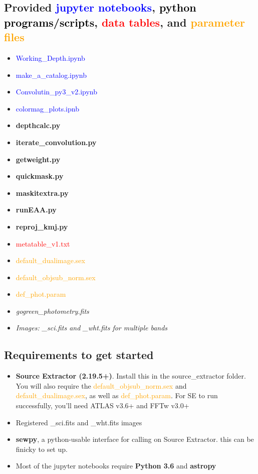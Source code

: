 \documentclass[a4paper,10pt]{article}
\begin{document}
\subsection*{Provided \textcolor{blue}{jupyter notebooks}, \textcolor{black}{\textbf{python programs/scripts}}, \textcolor{red}{data tables}, and \textcolor{orange}{parameter files}}
\begin{itemize}
 \setlength{\itemsep}{-5.5pt}
 \item \textcolor{blue}{Working\_Depth.ipynb}
 \item \textcolor{blue}{make\_a\_catalog.ipynb}
 \item \textcolor{blue}{Convolutin\_py3\_v2.ipynb}
 \item \textcolor{blue}{colormag\_plots.ipnb}
 \item \textbf{depthcalc.py}
 \item \textbf{iterate\_convolution.py}
 \item \textbf{getweight.py}
 \item \textbf{quickmask.py}
 \item \textbf{maskitextra.py}
 \item \textbf{runEAA.py}
 \item \textbf{reproj\_kmj.py}
 \item \textcolor{red}{metatable\_v1.txt}
 \item \textcolor{orange}{default\_dualimage.sex}
 \item \textcolor{orange}{default\_objsub\_norm.sex}
 \item \textcolor{orange}{def\_phot.param}
 \item \textit{gogreen\_photometry.fits}
 \item \textit{Images: \_sci.fits and \_wht.fits for multiple bands}
\end{itemize}


\subsection*{Requirements to get started}

\begin{itemize}
 \item \textbf{Source Extractor (2.19.5+)}. Install this in the source\_extractor folder. You will also require the \textcolor{orange}{default\_objsub\_norm.sex} and \textcolor{orange}{default\_dualimage.sex}, as well as \textcolor{orange}{def\_phot.param}. For SE to run successfully, you'll need ATLAS v3.6+ and FFTw v3.0+
 \item Registered \_sci.fits and \_wht.fits images
 \item \textbf{sewpy}, a python-usable interface for calling on Source Extractor. this can be finicky to set up.
 \item Most of the jupyter notebooks require \textbf{Python 3.6} and \textbf{astropy}
 \end{itemize}
\end{document}
